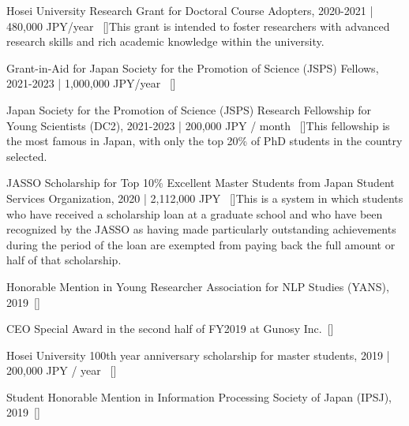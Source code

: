 \begin{talks}
    \award
    {Hosei University Research Grant for Doctoral Course Adopters, 2020-2021 | }{}{480,000 JPY/year \normalfont ~[\href{https://www.hosei.ac.jp/gs/gakuhi/gakuhi-shogakukin/shogakukin/kenkyujoseikin/}{\small{\websiteSymbol}}]}{This grant is intended to foster researchers with advanced research skills and rich academic knowledge within the university.}

    \award
    {Grant-in-Aid for Japan Society for the Promotion of Science (JSPS) Fellows, 2021-2023 | }{}{1,000,000 JPY/year \normalfont ~[\href{https://kaken.nii.ac.jp/en/grant/KAKENHI-PROJECT-21J14143/}{\small{\websiteSymbol}}]}{}

    \award
    {Japan Society for the Promotion of Science (JSPS) Research Fellowship for Young Scientists (DC2), 2021-2023 | }{}{200,000 JPY / month \normalfont ~[\href{https://www.jsps.go.jp/english/e-pd/index.html}{\small{\websiteSymbol}}]}{This fellowship is the most famous in Japan, with only the top 20\% of PhD students in the country selected.}

	\award
    {JASSO Scholarship for Top 10\% Excellent Master Students from Japan Student Services Organization, 2020 | }{}{2,112,000 JPY \normalfont ~[\href{https://www.jsps.go.jp/english/e-pd/index.html}{\small{\websiteSymbol}}]}{This is a system in which students who have received a scholarship loan at a graduate school and who have been recognized by the JASSO as having made particularly outstanding achievements during the period of the loan are exempted from paying back the full amount or half of that scholarship.}

	\award
    {Honorable Mention in Young Researcher Association for NLP Studies (YANS), 2019}{}{\normalfont ~[\href{https://www.hosei.ac.jp/gs/NEWS/zaigaku/koganei/20190920/}{\small{\websiteSymbol}}]}{}

	\award
    {CEO Special Award in the second half of FY2019 at Gunosy Inc.}{}{\normalfont ~[\href{https://gunosiru.gunosy.co.jp/entry/party-7th-secondhalf}{\small{\websiteSymbol}}]}{}

	\award
    {Hosei University 100th year anniversary scholarship for master students, 2019 | }{}{200,000 JPY / year \normalfont ~[\href{https://www.hosei.ac.jp/application/files/2715/8977/4261/2020_3-3.pdf}{\small{\websiteSymbol}}]}{}

	\award
    {Student Honorable Mention in Information Processing Society of Japan (IPSJ), 2019}{}{\normalfont ~[\href{https://www.hosei.ac.jp/gs/NEWS/topics/jusho/190411_4/}{\small{\websiteSymbol}}]}{}

\end{talks}    

